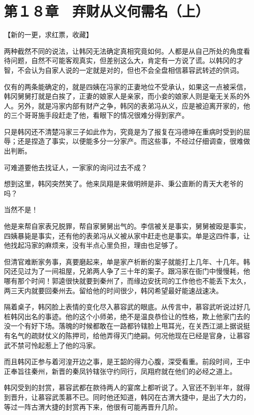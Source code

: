 \section{第１８章　弃财从义何需名（上）}

【新的一更，求红票，收藏】

两种截然不同的说法，让韩冈无法确定真相究竟如何。人都是从自己所处的角度看待问题，自然不可能客观真实，但差别这么大，肯定有一方说了谎。以韩冈的才智，不会认为自家人说的一定就是对的，但也不会全盘相信慕容武转述的供词。

仅有的两条能确定的，就是四姨在冯家的正妻地位不受承认，如果这一点被采信，韩冈舅舅打就是白挨了，正妻的娘家人是亲家，而小妾的娘家人则是毫无关系的外人。另外，就是冯家内部有财产之争，韩冈的表弟冯从义，应是被迫离开家的，他的三个哥哥施手段赶走了他，看眼下的情况很难分得到家产。

只是韩冈还不清楚冯家三子如此作为，究竟是为了报复在冯德坤在重病时受到的屈辱；还是捏造了事实，以便能多分一分家产。而这些事，不经过仔细调查，很难做出判断。

可难道要他去找证人，一家家的询问过去不成？

想到这里，韩冈突然笑了。他来凤翔是来做明辨是非、秉公直断的青天大老爷的吗？

当然不是！

他是来帮自家表兄脱罪，帮自家舅舅出气的。李信被关是事实，舅舅被殴是事实，四姨暴毙是事实，还有他的表弟冯从义被从家中赶走也是事实。单是这四件事，让他找起冯家的麻烦来，没有半点心里负担，理由也足够了。

但清官难断家务事，真要磨起来，单是家产析断的案子就能打上几年、十几年。韩冈还见过为了一间祖屋，兄弟两人争了三十年的案子。跟冯家在衙门中慢慢耗，他哪有那个时间！郭逵很快就要到秦州了，而缘边安抚司的工作他也不能丢下太久，两三天内就要回秦州去。留给他的时间很少，韩冈希望最好能速战速决。

隔着桌子，韩冈脸上表情的变化尽入慕容武的眼底。从传言中，慕容武听说过好几桩韩冈出名的事迹。他的这个小师弟，绝不是温良恭俭让的性格，欺上他家门去的没一个有好下场。落魄的时候都敢在一路都钤辖脸上甩耳光，在关西江湖上据说挺有名气的疏财仗义的陈押司，给他弄得灭门绝嗣。何况他现在已经是官身，让慕容武不禁可怜起惹上了他的冯家。

而且韩冈正参与着河湟开边之事，是王韶的得力心腹，深受看重。前段时间，王中正奉旨往秦州，新晋的秦凤钤辖张守约同行，凤翔府就在他们的必经之道上。

韩冈受到的封赏，慕容武都在款待两人的宴席上都听说了。入官还不到半年，就得到晋升，让慕容武羡慕不已。同时他还知道，韩冈在古渭大捷中，是出了大力的，等过一阵古渭大捷的封赏再下来，他很有可能再晋升几阶。

